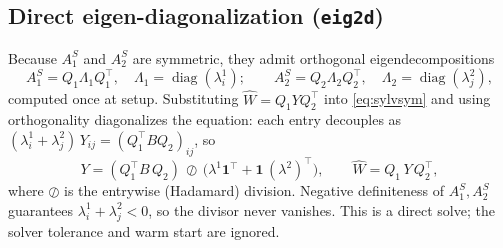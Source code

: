 \documentclass[hidelinks,onefignum,onetabnum]{siamart250211}
\newcommand{\AoneS}{A_1^{S}}
\newcommand{\AtwoS}{A_2^{S}}
\newcommand{\What}{\widehat{W}}
\begin{document}
\subsection{Direct eigen-diagonalization ({\tt eig2d})}
Because $\AoneS$ and $\AtwoS$ are symmetric, they admit orthogonal
eigendecompositions
\begin{equation}
\label{eq:eig}
\AoneS = Q_1\Lambda_1 Q_1^{\!\top}, \quad \Lambda_1=\operatorname{diag}(\lambda^1_i);
\qquad
\AtwoS = Q_2\Lambda_2 Q_2^{\!\top}, \quad \Lambda_2=\operatorname{diag}(\lambda^2_j),
\end{equation}
computed once at setup.  Substituting $\What = Q_1 Y Q_2^{\!\top}$ into
\cref{eq:sylvsym} and using orthogonality diagonalizes the equation: each entry
decouples as $(\lambda^1_i + \lambda^2_j)\,Y_{ij} = (Q_1^{\!\top}B Q_2)_{ij}$, so
\begin{equation}
\label{eq:eig2d}
Y = (Q_1^{\!\top} B\, Q_2)\,\oslash\,\bigl(\lambda^1\mathbf 1^{\!\top}
      + \mathbf 1\,(\lambda^2)^{\!\top}\bigr),
\qquad
\What = Q_1\, Y\, Q_2^{\!\top},
\end{equation}
where $\oslash$ is the entrywise (Hadamard) division.  Negative definiteness of
$\AoneS,\AtwoS$ guarantees $\lambda^1_i+\lambda^2_j<0$, so the divisor never
vanishes.  This is a direct solve; the solver tolerance and warm start are
ignored.
\end{document}
